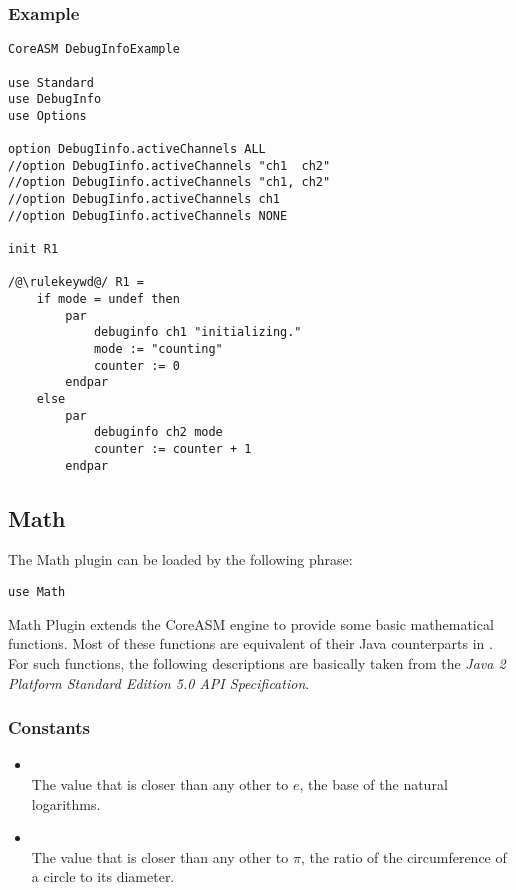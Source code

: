 \documentclass{article}
\newcommand{\CoreASM}{{\sffamily CoreASM}\xspace}
\begin{document}
\subsubsection*{Example}

\begin{lstlisting}
CoreASM DebugInfoExample

use Standard
use DebugInfo
use Options

option DebugIinfo.activeChannels ALL
//option DebugIinfo.activeChannels "ch1  ch2"
//option DebugIinfo.activeChannels "ch1, ch2"
//option DebugIinfo.activeChannels ch1
//option DebugIinfo.activeChannels NONE

init R1

/@\rulekeywd@/ R1 =
	if mode = undef then
		par
			debuginfo ch1 "initializing."
			mode := "counting"
			counter := 0
		endpar
	else
		par
			debuginfo ch2 mode
			counter := counter + 1
		endpar
\end{lstlisting}


\subsection{Math}
\label{math}

The Math plugin can be loaded by the following  phrase:

\begin{lstlisting}
use Math
\end{lstlisting}

\noindent Math Plugin extends the \CoreASM engine to provide some basic mathematical functions. Most of these functions are equivalent of their Java counterparts in . For such functions, the following descriptions are basically taken from the {\em Java 2 Platform Standard Edition 5.0 API Specification}. 

\subsubsection{Constants}

\begin{itemize}
\item {\bf {}} \\ The value that is closer than any other to $e$, the base of the natural logarithms.
\item {\bf {}} \\   The value that is closer than any other to $\pi$, the ratio of the circumference of a 
 circle to its diameter. 
\end{itemize}
\end{document}
